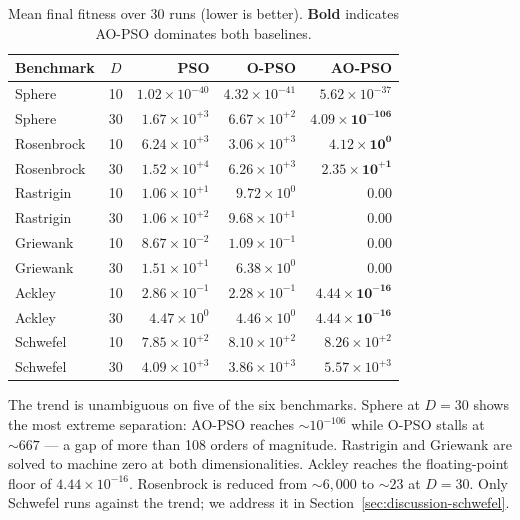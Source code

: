 \documentclass[11pt,a4paper]{article}
\newcommand{\algoname}{AO-PSO}
\newcommand{\opso}{O-PSO}
\newcommand{\stdpso}{PSO}
\begin{document}
\begin{table}[H]
\centering
\small
\renewcommand{\arraystretch}{1.2}
\begin{tabular}{l c r r r}
\toprule
\textbf{Benchmark} & \textbf{$D$} & \textbf{\stdpso} & \textbf{\opso} & \textbf{\algoname}\\
\midrule
Sphere     & 10 & $1.02\!\times\!10^{-40}$ & $4.32\!\times\!10^{-41}$ & $5.62\!\times\!10^{-37}$        \\
Sphere     & 30 & $1.67\!\times\!10^{+3}$  & $6.67\!\times\!10^{+2}$  & $\mathbf{4.09\!\times\!10^{-106}}$\\
\midrule
Rosenbrock & 10 & $6.24\!\times\!10^{+3}$  & $3.06\!\times\!10^{+3}$  & $\mathbf{4.12\!\times\!10^{0}}$ \\
Rosenbrock & 30 & $1.52\!\times\!10^{+4}$  & $6.26\!\times\!10^{+3}$  & $\mathbf{2.35\!\times\!10^{+1}}$\\
\midrule
Rastrigin  & 10 & $1.06\!\times\!10^{+1}$  & $9.72\!\times\!10^{0}$   & $\mathbf{0.00}$                 \\
Rastrigin  & 30 & $1.06\!\times\!10^{+2}$  & $9.68\!\times\!10^{+1}$  & $\mathbf{0.00}$                 \\
\midrule
Griewank   & 10 & $8.67\!\times\!10^{-2}$  & $1.09\!\times\!10^{-1}$  & $\mathbf{0.00}$                 \\
Griewank   & 30 & $1.51\!\times\!10^{+1}$  & $6.38\!\times\!10^{0}$   & $\mathbf{0.00}$                 \\
\midrule
Ackley     & 10 & $2.86\!\times\!10^{-1}$  & $2.28\!\times\!10^{-1}$  & $\mathbf{4.44\!\times\!10^{-16}}$\\
Ackley     & 30 & $4.47\!\times\!10^{0}$   & $4.46\!\times\!10^{0}$   & $\mathbf{4.44\!\times\!10^{-16}}$\\
\midrule
Schwefel   & 10 & $7.85\!\times\!10^{+2}$  & $8.10\!\times\!10^{+2}$  & $8.26\!\times\!10^{+2}$         \\
Schwefel   & 30 & $4.09\!\times\!10^{+3}$  & $3.86\!\times\!10^{+3}$  & $5.57\!\times\!10^{+3}$         \\
\bottomrule
\end{tabular}
\caption{Mean final fitness over 30 runs (lower is better). \textbf{Bold}
indicates \algoname{} dominates both baselines.}
\label{tab:mainresults}
\end{table}

The trend is unambiguous on five of the six benchmarks. Sphere at $D=30$
shows the most extreme separation: \algoname{} reaches $\sim 10^{-106}$
while \opso{} stalls at $\sim 667$ --- a gap of more than 108 orders of
magnitude. Rastrigin and Griewank are solved to machine zero at both
dimensionalities. Ackley reaches the floating-point floor of $4.44\times
10^{-16}$. Rosenbrock is reduced from $\sim\!\!6{,}000$ to $\sim\!\!23$ at
$D=30$. Only Schwefel runs against the trend; we address it in
Section~\ref{sec:discussion-schwefel}.
\end{document}
